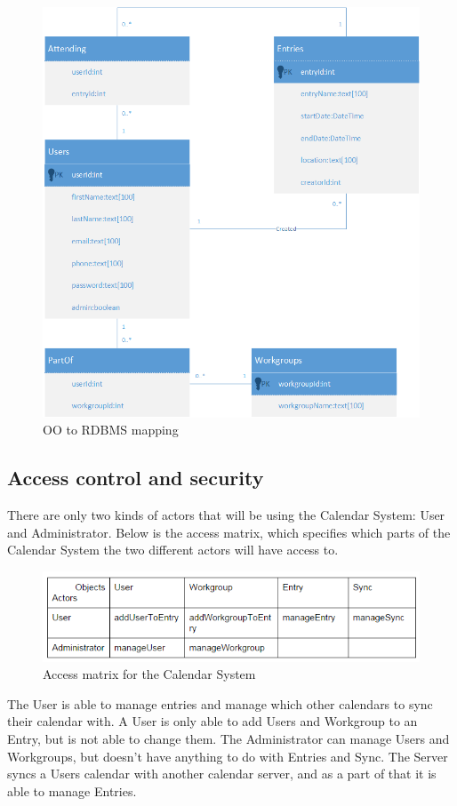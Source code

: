 \begin{figure}[h]
\centering
\includegraphics[scale = 0.7]{rdbms}
\caption{OO to RDBMS mapping}
\end{figure}

\pagebreak

\subsection{Access control and security}
There are only two kinds of actors that will be using the Calendar System: User and Administrator. Below is the access matrix, which specifies which parts of the Calendar System the two different actors will have access to.

\begin{figure}[h]
\centering
\includegraphics[scale = 0.8]{accessControl}
\caption{Access matrix for the Calendar System}
\end{figure}
The User is able to manage entries and manage which other calendars to sync their calendar with. A User is only able to add Users and Workgroup to an Entry, but is not able to change them.
The Administrator can manage Users and Workgroups, but doesn’t have anything to do with Entries and Sync.
The Server syncs a Users calendar with another calendar server, and as a part of that it is able to manage Entries.

